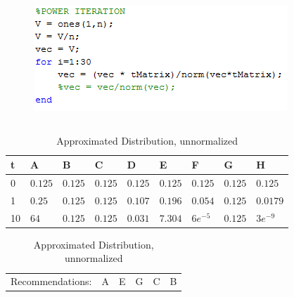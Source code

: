 \begin{frame}
\begin{table}
\begin{columns}
\begin{column}{0.6\textwidth}
			\begin{figure}
				\centering
				\includegraphics[scale=.6]{graphics/poweriteration.png}
			\end{figure}
		\end{column}
	\end{columns}
	\footnotesize
	\begin{table}
		\begin{tabular}{|l|llllllll|}\hline
			t & A & B & C & D & E & F & G & H \\ \hline
			0 & $0.125$ & $0.125$ & $0.125$ & $0.125$ & $0.125$ & $0.125$ & $0.125$ & $0.125$ \\
			1 & $0.25$ & $0.125$ & $0.125$ & $0.107$ & $0.196$ & $0.054$ & $0.125$ & $0.0179$ \\
			10& $64$ & $0.125$ & $0.125$ & $0.031$ & $7.304$ & $6e^{-5}$ & $0.125$ & $3e^{-9}$ \\ \hline
		\end{tabular}
		\caption{Approximated Distribution, unnormalized}
	\end{table}
	\begin{tabular}{llllll}
		Recommendations: & A & E & G & C & B
	\end{tabular}
\end{table}
\end{frame}

%
%
%
